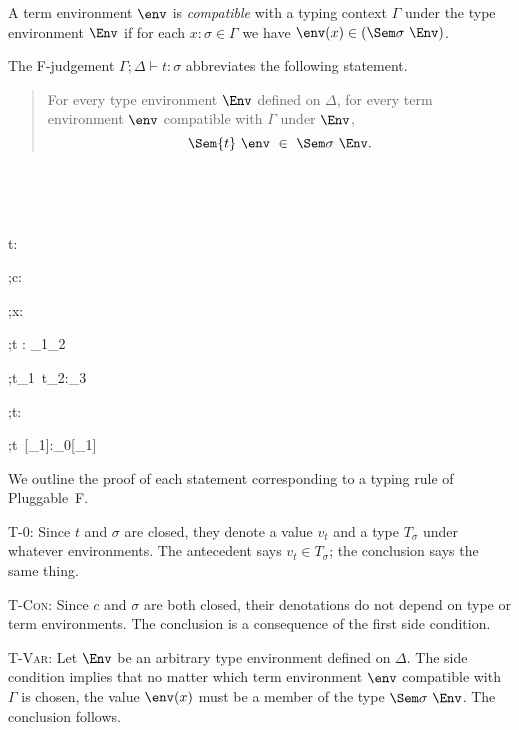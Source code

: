 \documentclass{amsart}
\begin{document}

A term environment $\env$ is \emph{compatible} with a typing
context $\Gamma$ under the type environment $\Env$ if for each
$x:\sigma\in\Gamma$ we have $\env(x)\in(\Sem\sigma~\Env)$.

The F-judgement $\Gamma;\Delta\vdash t:\sigma$ abbreviates the
following statement.
\begin{quotation}
For every type environment $\Env$ defined on $\Delta$, for every
term environment $\env$ compatible with $\Gamma$ under $\Env$,
\[
\Sem{t}~\env~\in~\Sem\sigma~\Env.
\]
\end{quotation}~


~

{t:\sigma}

{\Gamma;\Delta\vdash c:\sigma}

{\Gamma;\Delta\vdash x:\sigma}

{\Gamma;\Delta\vdash{}t : \sigma_1\R\sigma_2}

{\Gamma;\Delta\vdash t_1~t_2:\sigma_3}

{\Gamma;\Delta\vdash\Tabs\alpha t:\All\alpha\sigma}

{\Gamma;\Delta\vdash t~[\sigma_1]:\sigma_0[\alpha\mapsto\sigma_1]}



We outline the proof of each statement corresponding to a typing
rule of Pluggable~F.

\textsc{T-0}: Since $t$ and $\sigma$ are closed, they denote a
value $v_t$ and a type $T_\sigma$ under whatever environments.
The antecedent says $v_t\in T_\sigma$; the conclusion says the
same thing.

\textsc{T-Con}: Since $c$ and $\sigma$ are both closed, their
denotations do not depend on type or term environments. The
conclusion is a consequence of the first side condition.

\textsc{T-Var}: Let $\Env$ be an arbitrary type environment
defined on $\Delta$. The side condition implies that no matter
which term environment $\env$ compatible with $\Gamma$ is chosen,
the value $\env(x)$ must be a member of the type
$\Sem\sigma~\Env$. The conclusion follows.
\end{document}
